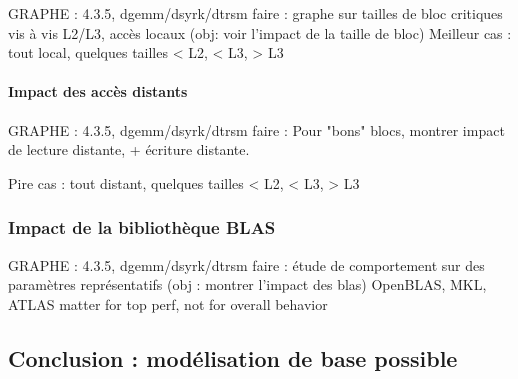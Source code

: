 GRAPHE : 4.3.5, dgemm/dsyrk/dtrsm faire : graphe sur tailles de bloc critiques vis à vis L2/L3, accès locaux (obj: voir l'impact de la taille de bloc)
Meilleur cas : tout local, quelques tailles < L2, < L3, > L3

\paragraph{Impact des accès distants}

GRAPHE : 4.3.5, dgemm/dsyrk/dtrsm faire : Pour "bons" blocs, montrer impact de lecture distante, + écriture distante.

Pire cas : tout distant, quelques tailles < L2, < L3, > L3

\subsubsection{Impact de la bibliothèque BLAS}

GRAPHE : 4.3.5, dgemm/dsyrk/dtrsm faire : étude de comportement sur des paramètres représentatifs (obj : montrer l'impact des blas)
OpenBLAS, MKL, ATLAS
matter for top perf, not for overall behavior

\subsection{Conclusion : modélisation de base possible}

